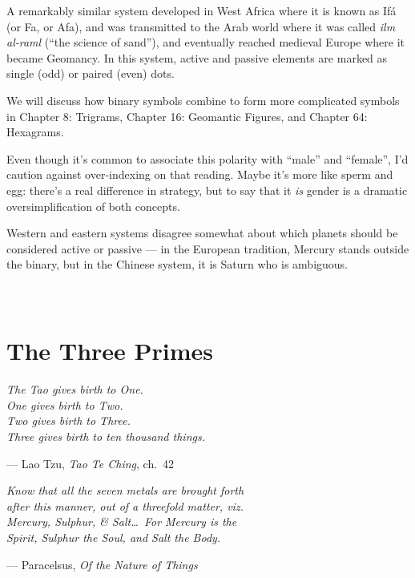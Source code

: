 \documentclass[openright]{book}
\newcommand{\numchapter}[2]{%
  \newpage
  \section*{{\fontsize{14}{17}\selectfont #1}\\[2mm] #2}%
  \addcontentsline{toc}{section}{#1\hspace{1.5mm}#2}%
}
\begin{document}
A remarkably similar system developed in West Africa where it is known as Ifá (or Fa, or Afa), and was transmitted to the Arab world where it was called \textit{ilm al-raml} (``the science of sand''), and eventually reached medieval Europe where it became Geomancy. In this system, active and passive elements are marked as single (odd) or paired (even) dots.

We will discuss how binary symbols combine to form more complicated symbols in Chapter 8: Trigrams, Chapter 16: Geomantic Figures, and Chapter 64: Hexagrams.

Even though it's common to associate this polarity with ``male'' and ``female'', I'd caution against over-indexing on that reading. Maybe it's more like sperm and egg: there's a real difference in strategy, but to say that it \textit{is} gender is a dramatic oversimplification of both concepts.

Western and eastern systems disagree somewhat about which planets should be considered active or passive --- in the European tradition, Mercury stands outside the binary, but in the Chinese system, it is Saturn who is ambiguous.

\numchapter{3}{The Three Primes}

\begin{center}\fontsize{10}{13}\selectfont\itshape
The Tao gives birth to One.\\
One gives birth to Two.\\
Two gives birth to Three.\\
Three gives birth to ten thousand things.
\end{center}
\begin{flushright}
{\fontsize{8}{10}\selectfont --- Lao Tzu, \textit{Tao Te Ching}, ch.\ 42}
\end{flushright}

\vspace{2mm}

\begin{center}\fontsize{10}{13}\selectfont\itshape
Know that all the seven metals are brought forth\\
after this manner, out of a threefold matter, viz.\\
Mercury, Sulphur, \& Salt\ldots\ For Mercury is the\\
Spirit, Sulphur the Soul, and Salt the Body.
\end{center}
\begin{flushright}
{\fontsize{8}{10}\selectfont --- Paracelsus, \textit{Of the Nature of Things}}
\end{flushright}
\end{document}

